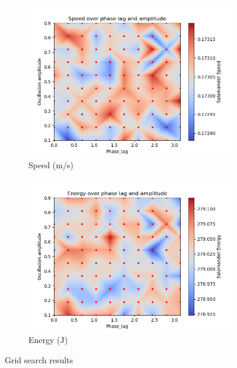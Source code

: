 \documentclass{cmc}
\begin{document}
\begin{figure}[H] 
  \begin{subfigure}[b]{0.5\linewidth}
    \centering
    \includegraphics[width=0.9\linewidth]{figures/Speed.png} 
    \caption{Speed (m/s)} 
    \label{fig:exercise8b_results:a} 
  \end{subfigure}%
  \begin{subfigure}[b]{0.5\linewidth}
    \centering
    \includegraphics[width=0.9\linewidth]{figures/Energy.png} 
    \caption{Energy (J)} 
    \label{fig:exercise8a_results:b} 
  \end{subfigure}
  \caption{Grid search results}
  \label{fig:exercise8b_results} 
\end{figure}
\end{document}
